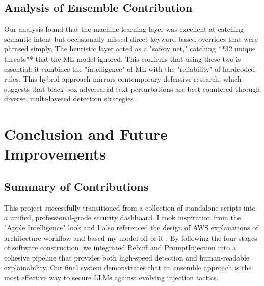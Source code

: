 \documentclass{article}
\begin{document}
\subsection{Analysis of Ensemble Contribution}
Our analysis found that the machine learning layer was excellent at catching semantic intent but occasionally missed direct keyword-based overrides that were phrased simply. The heuristic layer acted as a "safety net," catching **32 unique threats** that the ML model ignored. This confirms that using these two is essential: it combines the "intelligence" of ML with the "reliability" of hardcoded rules. This hybrid approach mirrors contemporary defensive research, which suggests that black-box adversarial text perturbations are best countered through diverse, multi-layered detection strategies \cite{deanda2025}.

\section{Conclusion and Future Improvements}

\subsection{Summary of Contributions}
This project successfully transitioned from a collection of standalone scripts into a unified, professional-grade security dashboard. I took inspiration from the "Apple Intelligence" look \cite{apple_intelligence} and I also referenced the design of AWS explanations of architecture workflow and based my model off of it \cite{aws_architecture}. By following the four stages of software construction, we integrated Rebuff and PromptInjection into a cohesive pipeline that provides both high-speed detection and human-readable explainability. Our final system demonstrates that an ensemble approach is the most effective way to secure LLMs against evolving injection tactics.
\end{document}
